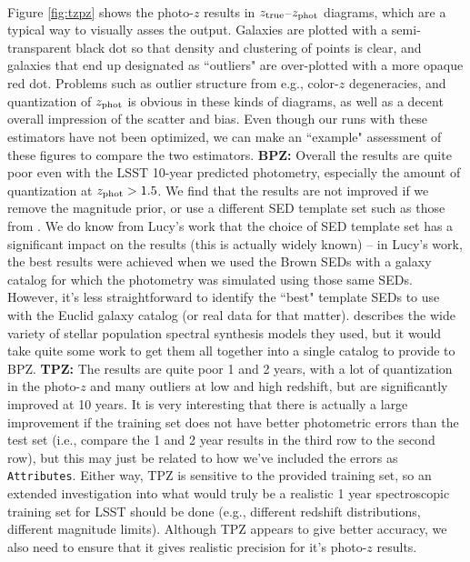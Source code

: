 \documentclass[DM,lsstdraft,toc]{lsstdoc}
\begin{document}
\smallskip {} \\
Figure \ref{fig:tzpz} shows the photo-$z$ results in $z_{\rm true}$--$z_{\rm phot}$ diagrams, which are a typical way to visually asses the output. Galaxies are plotted with a semi-transparent black dot so that density and clustering of points is clear, and galaxies that end up designated as ``outliers" are over-plotted with a more opaque red dot. Problems such as outlier structure from e.g., color-$z$ degeneracies, and quantization of $z_{\rm phot}$ is obvious in these kinds of diagrams, as well as a decent overall impression of the scatter and bias. Even though our runs with these estimators have not been optimized, we can make an ``example" assessment of these figures to compare the two estimators.
{\bf BPZ:} Overall the results are quite poor even with the LSST 10-year predicted photometry, especially the amount of quantization at $z_{\rm phot}>1.5$. We find that the results are not improved if we remove the magnitude prior, or use a different SED template set such as those from \cite{2014ApJS..212...18B}. We do know from Lucy's work that the choice of SED template set has a significant impact on the results (this is actually widely known) -- in Lucy's work, the best results were achieved when we used the Brown SEDs with a galaxy catalog for which the photometry was simulated using those same SEDs. However, it's less straightforward to identify the ``best" template SEDs to use with the Euclid galaxy catalog (or real data for that matter). \cite{2014MNRAS.439..264G} describes the wide variety of stellar population spectral synthesis models they used, but it would take quite some work to get them all together into a single catalog to provide to BPZ.
{\bf TPZ:} The results are quite poor 1 and 2 years, with a lot of quantization in the photo-$z$ and many outliers at low and high redshift, but are significantly improved at 10 years. It is very interesting that there is actually a large improvement if the training set does not have better photometric errors than the test set (i.e., compare the 1 and 2 year results in the third row to the second row), but this may just be related to how we've included the errors as {\tt Attributes}. Either way, TPZ is sensitive to the provided training set, so an extended investigation into what would truly be a realistic 1 year spectroscopic training set for LSST should be done (e.g., different redshift distributions, different magnitude limits). Although TPZ appears to give better accuracy, we also need to ensure that it gives realistic precision for it's photo-$z$ results.
\end{document}

